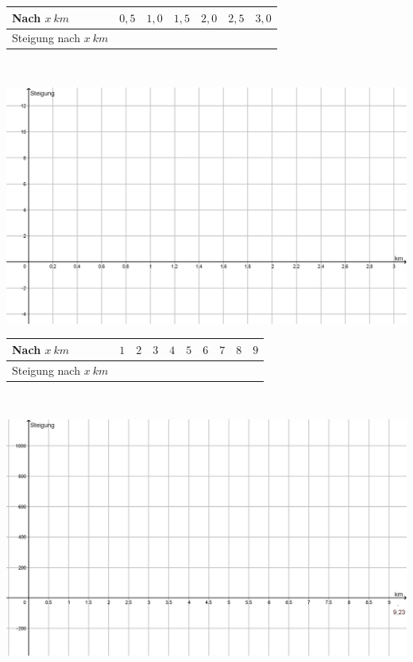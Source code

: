 \documentclass[oneside,openany,headings=optiontotoc,11pt,numbers=noenddot]{scrreprt}
\begin{document}
	\begin{landscape}
		\renewcommand{\arraystretch}{1.5}
		\begin{tabularx}{1.3\textwidth}{L{2cm}|M|M|M|M|M|M|}
			Nach \(x\ km\) & \(0,5\) & \(1,0\) & \(1,5\) & \(2,0\) & \(2,5\) & \(3,0\)\\
			\hline
			Steigung nach \(x\ km\) & & & & & &\\
		\end{tabularx}\\
		\par\noindent
		\includegraphics[width=1.4\textwidth,align=t]{../99_Bilder/190212_Hoehenprofil_3L.png}
	\end{landscape}
	\newpage
	\begin{landscape}
		\renewcommand{\arraystretch}{1.5}
		\begin{tabularx}{1.3\textwidth}{L{2cm}|M|M|M|M|M|M|M|M|M|}
			Nach \(x\ km\) & \(1\) & \(2\) & \(3\) & \(4\) & \(5\) & \(6\) & \(7\) & \(8\) & \(9\)\\
			\hline
			Steigung nach \(x\ km\) & & & & & & & & &\\
		\end{tabularx}\\
		\par\noindent
		\includegraphics[width=1.4\textwidth,align=t]{../99_Bilder/190212_Hoehenprofil_2L.png}
	\end{landscape}
\end{document}
